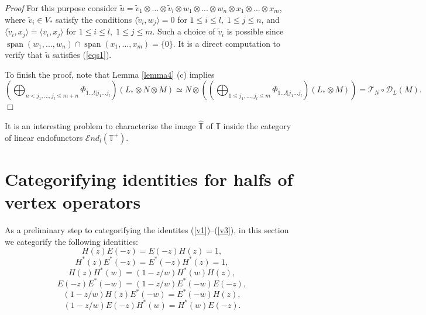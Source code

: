 \documentclass[11pt]{amsart}
\renewenvironment{proof}{ \emph{Proof}}{$\Box$}
\newcommand{\refeq}[1]{(\ref{#1})}
\begin{document}
\begin{proof}
For this purpose consider $\tilde{u}=\tilde{v}_1\otimes\dots\otimes\tilde{v}_l\otimes w_1\otimes...\otimes w_n\otimes x_1\otimes ...\otimes x_m $, 
where $\tilde{v}_i\in V_*$ satisfy the conditions 
$\langle \tilde{v}_i,w_j \rangle=0$
for $1\leq i\leq l,\; 1\leq j\leq n$, and $\langle \tilde{v}_i,x_j \rangle=\langle v_i,x_j \rangle$
for $1\leq i\leq l,\; 1\leq j\leq m$. Such a choice of $\tilde{v}_i$ is
possible since  $\operatorname{span} (w_1,...,w_n)\cap \operatorname{span} (x_1,\dots,x_m)=\{0\}$. 
It is a direct computation to verify that $\tilde{u}$ satisfies \refeq{eqs1}.

To finish the proof, note that  Lemma \ref {lemma4} (c) implies
$$\left(\bigoplus_{n<j_1,...,j_l\leq  m+n}\Phi_{1...l|j_1...j_l}\right)(L_*\otimes N\otimes M)\simeq 
N\otimes \left(\left(\bigoplus_{1\leq j_1,...,j_l\leq m}\Phi_{1...l|j_1...j_l} \right)(L_*\otimes M)\right)=
\mathcal T_{N}\circ \mathcal D_{L}(M).$$
\end{proof}


It is an interesting problem to characterize the image $\hat{\mathbb T}$ of $\mathbb T$ inside the category of linear endofunctors
$\mathcal{E}nd_l(\mathbb T^+)$. 

\section{Categorifying identities for halfs of vertex operators}

As a preliminary step to  categorifying the identites (\ref{v1})--(\ref{v3}),
in this section we categorify the following identities:
\begin{equation}\label{equ1}
H(z)E(-z)=E(-z)H(z)=1,
\end{equation}
\begin{equation}\label{equ2}
 H^*(z)E^*(-z)=E^*(-z)H^*(z)=1,
\end{equation}
\begin{equation}\label{equ3}
 H(z)H^*(w)=(1-z/w)H^*(w)H(z),
\end{equation}
\begin{equation}\label{equ4}
 E(-z)E^*(-w)=(1-z/w)E^*(-w)E(-z),
\end{equation}
\begin{equation}\label{equ5}
 (1-z/w)H(z)E^*(-w)=E^*(-w)H(z),
\end{equation}
\begin{equation}\label{equ6}
 (1-z/w)E(-z)H^*(w)=H^*(w)E(-z).
\end{equation}
\end{document}

